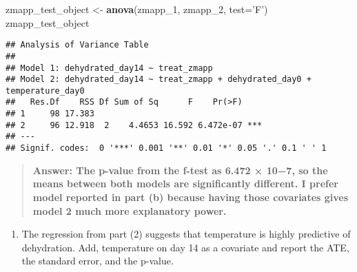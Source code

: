 \documentclass[
]{article}
\newenvironment{Shaded}{\begin{snugshade}}{\end{snugshade}}
\newcommand{\DataTypeTok}[1]{\textcolor[rgb]{0.13,0.29,0.53}{#1}}
\newcommand{\DecValTok}[1]{\textcolor[rgb]{0.00,0.00,0.81}{#1}}
\newcommand{\KeywordTok}[1]{\textcolor[rgb]{0.13,0.29,0.53}{\textbf{#1}}}
\newcommand{\NormalTok}[1]{#1}
\newcommand{\OperatorTok}[1]{\textcolor[rgb]{0.81,0.36,0.00}{\textbf{#1}}}
\newcommand{\StringTok}[1]{\textcolor[rgb]{0.31,0.60,0.02}{#1}}
\providecommand{\tightlist}{%
  \setlength{\itemsep}{0pt}\setlength{\parskip}{0pt}}
\begin{document}
\begin{Shaded}
\begin{Highlighting}[]
\NormalTok{zmapp_test_object <-}\StringTok{ }\KeywordTok{anova}\NormalTok{(zmapp_}\DecValTok{1}\NormalTok{, zmapp_}\DecValTok{2}\NormalTok{, }\DataTypeTok{test=}\StringTok{'F'}\NormalTok{)}
\NormalTok{zmapp_test_object}
\end{Highlighting}
\end{Shaded}

\begin{verbatim}
## Analysis of Variance Table
## 
## Model 1: dehydrated_day14 ~ treat_zmapp
## Model 2: dehydrated_day14 ~ treat_zmapp + dehydrated_day0 + temperature_day0
##   Res.Df    RSS Df Sum of Sq      F    Pr(>F)    
## 1     98 17.383                                  
## 2     96 12.918  2    4.4653 16.592 6.472e-07 ***
## ---
## Signif. codes:  0 '***' 0.001 '**' 0.01 '*' 0.05 '.' 0.1 ' ' 1
\end{verbatim}

\begin{quote}
\textbf{Answer: The p-value from the f-test as 6.472 × 10−7, so the
means between both models are significantly different. I prefer model
reported in part (b) because having those covariates gives model 2 much
more explanatory power.}
\end{quote}

\begin{enumerate}
\def\labelenumi{\arabic{enumi}.}
\setcounter{enumi}{3}
\tightlist
\item
  The regression from part (2) suggests that temperature is highly
  predictive of dehydration. Add, temperature on day 14 as a covariate
  and report the ATE, the standard error, and the p-value.
\end{enumerate}

\begin{Shaded}
\end{Shaded}
\end{document}
